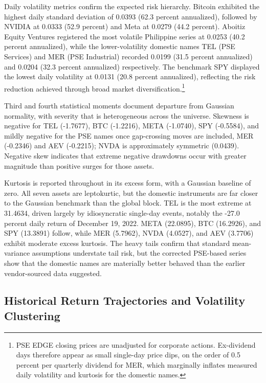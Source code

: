 Daily volatility metrics confirm the expected risk hierarchy. Bitcoin exhibited the highest daily standard deviation of 0.0393 (62.3 percent annualized), followed by NVIDIA at 0.0333 (52.9 percent) and Meta at 0.0279 (44.2 percent). Aboitiz Equity Ventures registered the most volatile Philippine series at 0.0253 (40.2 percent annualized), while the lower-volatility domestic names TEL (PSE Services) and MER (PSE Industrial) recorded 0.0199 (31.5 percent annualized) and 0.0204 (32.3 percent annualized) respectively. The benchmark SPY displayed the lowest daily volatility at 0.0131 (20.8 percent annualized), reflecting the risk reduction achieved through broad market diversification.\footnote{PSE EDGE closing prices are unadjusted for corporate actions. Ex-dividend days therefore appear as small single-day price dips, on the order of 0.5 percent per quarterly dividend for MER, which marginally inflates measured daily volatility and kurtosis for the domestic names.}

Third and fourth statistical moments document departure from Gaussian normality, with severity that is heterogeneous across the universe. Skewness is negative for TEL (-1.7677), BTC (-1.2216), META (-1.0740), SPY (-0.5584), and mildly negative for the PSE names once gap-crossing moves are included, MER (-0.2346) and AEV (-0.2215); NVDA is approximately symmetric (0.0439). Negative skew indicates that extreme negative drawdowns occur with greater magnitude than positive surges for those assets.

Kurtosis is reported throughout in its excess form, with a Gaussian baseline of zero. All seven assets are leptokurtic, but the domestic instruments are far closer to the Gaussian benchmark than the global block. TEL is the most extreme at 31.4634, driven largely by idiosyncratic single-day events, notably the -27.0 percent daily return of December 19, 2022. META (22.0895), BTC (16.2926), and SPY (13.3891) follow, while MER (5.7962), NVDA (4.0527), and AEV (3.7706) exhibit moderate excess kurtosis. The heavy tails confirm that standard mean-variance assumptions understate tail risk, but the corrected PSE-based series show that the domestic names are materially better behaved than the earlier vendor-sourced data suggested.

\subsection{Historical Return Trajectories and Volatility Clustering}

